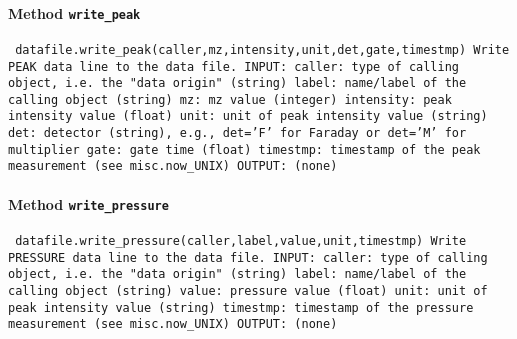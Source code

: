\paragraph{Method \texttt{write_peak}}
\vspace{1ex}
\texttt{\newline
datafile.write_peak(caller,mz,intensity,unit,det,gate,timestmp)\newline
\newline
Write PEAK data line to the data file.\newline
\newline
INPUT:\newline
caller: type of calling object, i.e. the "data origin" (string)\newline
label: name/label of the calling object (string)\newline
mz: mz value (integer)\newline
intensity: peak intensity value (float)\newline
unit: unit of peak intensity value (string)\newline
det: detector (string), e.g., det='F' for Faraday or det='M' for multiplier\newline
gate: gate time (float)\newline
timestmp: timestamp of the peak measurement (see misc.now_UNIX)\newline
\newline
OUTPUT:\newline
(none)\newline
\newline
}

\paragraph{Method \texttt{write_pressure}}
\vspace{1ex}
\texttt{\newline
datafile.write_pressure(caller,label,value,unit,timestmp)\newline
\newline
Write PRESSURE data line to the data file.\newline
\newline
INPUT:\newline
caller: type of calling object, i.e. the "data origin" (string)\newline
label: name/label of the calling object (string)\newline
value: pressure value (float)\newline
unit: unit of peak intensity value (string)\newline
timestmp: timestamp of the pressure measurement (see misc.now_UNIX)\newline
\newline
OUTPUT:\newline
(none)\newline
\newline
}

